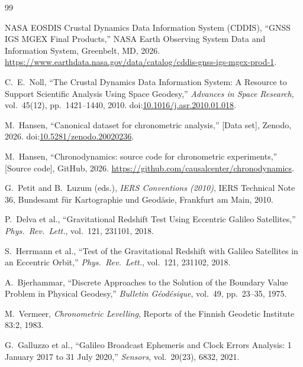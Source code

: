 \documentclass[11pt,a4paper]{article}
\begin{document}
\begin{thebibliography}{99}

NASA EOSDIS Crustal Dynamics Data Information System (CDDIS), ``GNSS IGS MGEX Final Products,'' NASA Earth Observing System Data and Information System, Greenbelt, MD, 2026. \url{https://www.earthdata.nasa.gov/data/catalog/cddis-gnss-igs-mgex-prod-1}.

C.~E.~Noll, ``The Crustal Dynamics Data Information System: A Resource to Support Scientific Analysis Using Space Geodesy,'' \emph{Advances in Space Research}, vol.~45(12), pp.~1421--1440, 2010. doi:\href{https://doi.org/10.1016/j.asr.2010.01.018}{10.1016/j.asr.2010.01.018}.

M.~Hansen, ``Canonical dataset for chronometric analysis,'' [Data set], Zenodo, 2026. doi:\href{https://doi.org/10.5281/zenodo.20020236}{10.5281/zenodo.20020236}.

M.~Hansen, ``Chronodynamics: source code for chronometric experiments,'' [Source code], GitHub, 2026. \url{https://github.com/causalcenter/chronodynamics}.

G.~Petit and B.~Luzum (eds.), \emph{IERS Conventions (2010)}, IERS Technical Note 36, Bundesamt f\"ur Kartographie und Geod\"asie, Frankfurt am Main, 2010.

P.~Delva et al., ``Gravitational Redshift Test Using Eccentric Galileo Satellites,'' \emph{Phys.\ Rev.\ Lett.}, vol.~121, 231101, 2018.

S.~Herrmann et al., ``Test of the Gravitational Redshift with Galileo Satellites in an Eccentric Orbit,'' \emph{Phys.\ Rev.\ Lett.}, vol.~121, 231102, 2018.

A.~Bjerhammar, ``Discrete Approaches to the Solution of the Boundary Value Problem in Physical Geodesy,'' \emph{Bulletin G\'eod\'esique}, vol.~49, pp.~23--35, 1975.

M.~Vermeer, \emph{Chronometric Levelling}, Reports of the Finnish Geodetic Institute 83:2, 1983.

G.~Galluzzo et al., ``Galileo Broadcast Ephemeris and Clock Errors Analysis: 1 January 2017 to 31 July 2020,'' \emph{Sensors}, vol.~20(23), 6832, 2021.


\end{thebibliography}
\end{document}

